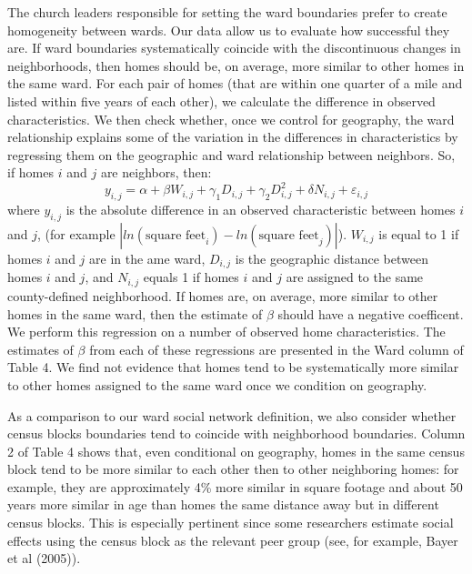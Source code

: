 \documentclass[12pt]{article}
\begin{document}
    The church leaders responsible for setting the ward boundaries prefer to create homogeneity between wards. Our data allow us to evaluate how
    successful they are. If ward boundaries systematically coincide with the discontinuous changes in neighborhoods, then homes should be, on average,
    more similar to other homes in the same ward. For each pair of homes (that are within one quarter of a mile and listed within five years of each
    other), we calculate the difference in observed characteristics. We then check whether, once we control for geography, the ward relationship
    explains some of the variation in the differences in characteristics by regressing them on the geographic and ward relationship between
    neighbors. So, if homes $i$ and $j$ are neighbors, then:
    \[ y_{i,j}  = \alpha + \beta W_{i,j} + \gamma_1 D_{i,j} + \gamma_2 D^2_{i,j} + \delta N_{i,j} + \varepsilon_{i,j} \]
    where $ y_{i,j} $ is the absolute difference in an observed characteristic between homes $ i $ and $ j $, (for example $ |ln(\textrm{square
    feet}_i) - ln(\textrm{square feet}_j)| $). $ W_{i,j} $ is equal to 1 if homes $i$ and $j$ are in the ame ward, $ D_{i,j} $ is the geographic
    distance between homes $i$ and $j$, and $ N_{i,j} $ equals 1 if homes $i$ and $j$ are assigned to the same county-defined neighborhood.
    If homes are, on average, more similar to other homes in the same ward, then the estimate of $ \beta $ should have a negative coefficent. We
    perform this regression on a number of observed home characteristics. The estimates of $\beta$ from each of these regressions are presented in
    the Ward column of Table 4. We find not evidence that homes tend to be systematically more similar to other homes assigned to the same ward once
    we condition on geography.

    As a comparison to our ward social network definition, we also consider whether census blocks boundaries tend to coincide with neighborhood
    boundaries. Column 2 of Table 4 shows that, even conditional on geography, homes in the same census block tend to be more similar to each other
    then to other neighboring homes: for example, they are approximately 4\% more similar in square footage and about 50 years more similar in age
    than homes the same distance away but in different census blocks. This is especially pertinent since some researchers estimate social effects
    using the census block as the relevant peer group (see, for example, Bayer et al (2005)). 
\end{document}
